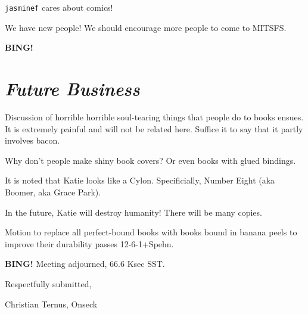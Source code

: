 \documentclass[10pt]{article}
\newcommand{\bing}{{\bf BING!} }
\newcommand{\goto}[1]{\bing \vskip 12pt \section*{{\em{#1}}}}
\begin{document}
\texttt{jasminef} cares about comics!

We have new people!  We should encourage more people to come to MITSFS.

\goto{Future Business}

Discussion of horrible horrible soul-tearing things that people do to books ensues.  It is extremely painful and will not be related here.  Suffice it to say that it partly involves bacon.

Why don't people make shiny book covers?  Or even books with glued bindings.

It is noted that Katie looks like a Cylon.  Specificially, Number Eight (aka Boomer, aka Grace Park).

In the future, Katie will destroy humanity!  There will be many copies.

Motion to replace all perfect-bound books with books bound in banana peels to improve their durability passes 12-6-1+Spehn.

\bing
\noindent
Meeting adjourned, 66.6 Ksec SST.

\vspace{18pt}

\centerline{Respectfully submitted,}
\centerline{Christian Ternus, Onseck}
\end{document}
